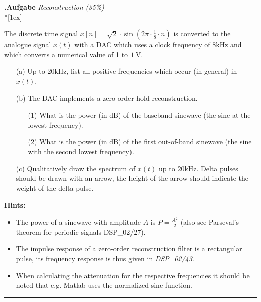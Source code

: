 \documentclass[12pt,a4paper,austrian]{article}
\newcounter{theaufgabe}\setcounter{theaufgabe}{1}
\newenvironment{aufgabe}[1]%
  {\bigskip\par\noindent\begin{nopagebreak}
   \textsf{\textbf{\arabic{theaufgabe}.\thinspace Aufgabe}}\quad
      \textsf{\textit{#1}}\\*[1ex]%
\stepcounter{theaufgabe}\hspace{2ex}\end{nopagebreak}}
  {\par\pagebreak[2]}
\begin{document}
\begin{aufgabe}{Reconstruction (35\%)}

The discrete time signal \(x[n] = \sqrt{2} \cdot \sin \left(2 \pi \cdot \frac{1}{8} \cdot n\right)\) is converted to the analogue signal \(x(t)\) with a DAC which uses a clock frequency of \(8 \mathrm{kHz}\) and which converts a numerical value of 1 to \(1 \mathrm{~V}\).

\begin{enumerate}
    \item[(a)] Up to $20 \mathrm{kHz}$, list all positive frequencies which occur (in general) in $x(t)$.

    \item[(b)] The DAC implements a zero-order hold reconstruction.

    \begin{enumerate}
        \item[(1)] What is the power (in \(\mathrm{dB}\)) of the baseband sinewave (the sine at the lowest frequency).

        \item[(2)] What is the power (in \(\mathrm{dB}\)) of the first out-of-band sinewave (the sine with the second lowest frequency).
    \end{enumerate}

    \item[(c)] Qualitatively draw the spectrum of \(x(t)\) up to \(20 \mathrm{kHz}\). Delta pulses should be drawn with an arrow, the height of the arrow should indicate the weight of the delta-pulse.
\end{enumerate}

\textbf{Hints:}
\begin{itemize}
    \item The power of a sinewave with amplitude \(A\) is \(P=\frac{A^{2}}{2}\) (also see Parseval's theorem for periodic signals DSP\_02/27).

    \item The impulse response of a zero-order reconstruction filter is a rectangular pulse, its frequency response is thus given in \emph{DSP\_02/43}.

    \item When calculating the attenuation for the respective frequencies it should be noted that e.g. Matlab uses the normalized sinc function.
\end{itemize}

\hrule

\begin{enumerate}



\end{enumerate}

\end{aufgabe}
\end{document}
